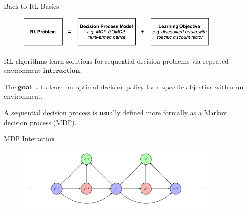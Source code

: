 \begin{frame}{Back to RL Basics}

    \begin{figure}
        \centering
        \includegraphics[width=0.9\textwidth,height=0.4\textheight,keepaspectratio]{images/chapter_2/rl-learning-problem.pdf}
        \label{fig:enter-label}
    \end{figure}

    \blist
        \item RL algorithms learn solutions for sequential decision problems via repeated environment \textbf{interaction}.
        \item The \textbf{goal} is to learn an optimal decision policy for a specific objective within an environment.  
        \item A sequential decision process is usually defined more formally as a Markov decision process (MDP).
    \elist
    
\end{frame}

\begin{frame}{MDP Interaction}
    
    \begin{figure}[htbp]
      \centering
      \includegraphics[width=0.9\textwidth,height=0.9\textheight,keepaspectratio]{images/1_mdp_diagram_elipses.pdf}
      \label{fig:mdp}
    \end{figure}
    
\end{frame}

